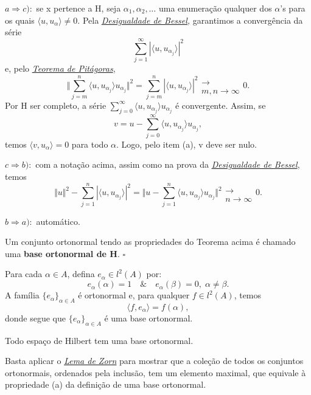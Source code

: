 \documentclass[../functional_analysis.tex]{subfiles}
\begin{document}
\begin{proof*}
	\(a \Rightarrow c):\) se x pertence a H, seja \(\alpha_1,\alpha_2,\dotsc \) uma enumeração qualquer dos \(\alpha \)'s para os quais \(\langle u, u_{\alpha } \rangle\neq 0\). Pela \hyperlink{bessel_inequality}{\textit{Desigualdade de Bessel,}} garantimos a convergência da série
	\[
		\sum\limits_{j=1}^{\infty}| \langle u, u_{\alpha_{j}} \rangle |^{2}
	\]
	e, pelo \hyperlink{pythagorean_theorem}{\textit{Teorema de Pitágoras}},
	\[
		\biggl\Vert \sum\limits_{j=m}^{n}\langle u, u_{\alpha_{j}} \rangle u_{\alpha_{j}} \biggr\Vert^{2}=\sum\limits_{j=m}^{n}| \langle u, u_{\alpha_{j}} \rangle |^{2} \substack{ \\ \longrightarrow \\ m,n\to \infty}0.
	\]
	Por H ser completo, a série \(\sum\limits_{j=0}^{\infty}\langle u, u_{\alpha_{j}} \rangle u_{\alpha_{j}}\) é convergente. Assim, se
	\[
		v= u - \sum\limits_{j=0}^{\infty}\langle u, u_{\alpha_{j}} \rangle u_{\alpha_{j}},
	\]
	temos \(\langle v, u_{\alpha } \rangle =0\) para todo \(\alpha \). Logo, pelo item (a), v deve ser nulo.

	\(c \Rightarrow b):\) com a notação acima, assim como na prova da \hyperlink{bessel_inequality}{\textit{Desigualdade de Bessel}}, temos
	\[
		\Vert u \Vert^{2} -\sum\limits_{j=1}^{n}| \langle u, u_{\alpha_{j}} \rangle |^{2}=\biggl\Vert u - \sum\limits_{j=1}^{n}\langle u, u_{\alpha_{j}} \rangle u_{\alpha_{j}} \biggr\Vert^{2}\substack{ \\ \longrightarrow \\ n\to \infty}0.
	\]

	\(b \Rightarrow a):\) automático. \qedsymbol
\end{proof*}
\begin{def*}
	Um conjunto ortonormal tendo as propriedades do Teorema acima é chamado uma \textbf{base ortonormal de H}. \(\square\)
\end{def*}

Para cada \(\alpha \in A\), defina \(e_{\alpha }\in l^{2}(A)\) por:
\[
	e_{\alpha }(\alpha ) =1 \quad\&\quad e_{\alpha }(\beta )=0,\; \alpha \neq \beta .
\]
A família \(\{e_{\alpha }\}_{\alpha \in A}\) é ortonormal e, para qualquer \(f\in l^{2}(A)\), temos
\[
	\langle f, e_{\alpha } \rangle = f(\alpha ),
\]
donde segue que \(\{e_{\alpha }\}_{\alpha \in A}\) é uma base ortonormal.
\begin{theorem*}
	Todo espaço de Hilbert tem uma base ortonormal.
\end{theorem*}
\begin{proof*}
	Basta aplicar o \hyperlink{zorn_lemma}{\textit{Lema de Zorn}} para mostrar que a coleção de todos os conjuntos ortonormais, ordenados pela inclusão, tem um elemento maximal, que equivale à propriedade (a) da definição de uma base ortonormal. \qedsymbol
\end{proof*}
\end{document}

